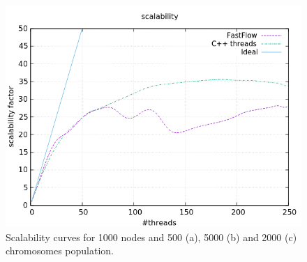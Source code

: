 \documentclass[a4paper,10pt]{article}
\begin{document}
\begin{figure}[H]
			\begin{minipage}[t]{0.32\linewidth}
				\includegraphics[width=\linewidth]{BenchMarkTSP/scalability/1000/SC100020000_zoom.png}
				\subcaption{}
			\end{minipage}
			\caption{Scalability curves for 1000 nodes and 500 (a), 5000 (b) and 2000 (c) chromosomes population.}
			\label{1000s}
		\end{figure}
	
\end{document}
